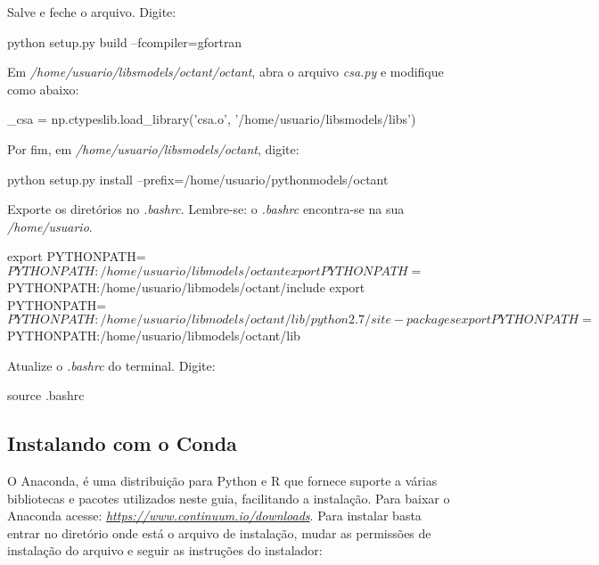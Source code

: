 \noindent Salve e feche o arquivo. Digite:
\bigskip

\begin{bashcode}
python setup.py build --fcompiler=gfortran
\end{bashcode}
\bigskip

\noindent Em \textit{/home/usuario/libsmodels/octant/octant}, abra o arquivo \textit{csa.py} e modifique como abaixo:
\bigskip

\begin{bashcode}
_csa = np.ctypeslib.load_library('csa.o', '/home/usuario/libsmodels/libs')
\end{bashcode}
\bigskip

\noindent Por fim, em \textit{/home/usuario/libsmodels/octant}, digite:
\bigskip

\begin{bashcode}
python setup.py install --prefix=/home/usuario/pythonmodels/octant
\end{bashcode}
\bigskip

\noindent Exporte os diretórios no \textit{.bashrc}. Lembre-se: o \textit{.bashrc} encontra-se na sua \textit{/home/usuario}.
\bigskip

\begin{bashcode}[fontsize=\scriptsize]
export PYTHONPATH=$PYTHONPATH:/home/usuario/libmodels/octant
export PYTHONPATH=$PYTHONPATH:/home/usuario/libmodels/octant/include
export PYTHONPATH=$PYTHONPATH:/home/usuario/libmodels/octant/lib/python2.7/site-packages
export PYTHONPATH=$PYTHONPATH:/home/usuario/libmodels/octant/lib
\end{bashcode}
\bigskip

\noindent Atualize o \textit{.bashrc} do terminal. Digite:
\bigskip

\begin{bashcode}
source .bashrc
\end{bashcode}
\bigskip

\subsection{Instalando com o Conda}\label{condasec}
\bigskip
\noindent O Anaconda, é uma distribuição para Python e R que fornece suporte a várias bibliotecas e pacotes utilizados neste guia, facilitando a instalação. Para baixar o Anaconda acesse: \textcolor{bleu_cite}{\href{https://www.continuum.io/downloads}{\textit{https://www.continuum.io/downloads}}}. Para instalar basta entrar no diretório onde está o arquivo de instalação, mudar as permissões de instalação do arquivo e seguir as instruções do instalador:
\bigskip

